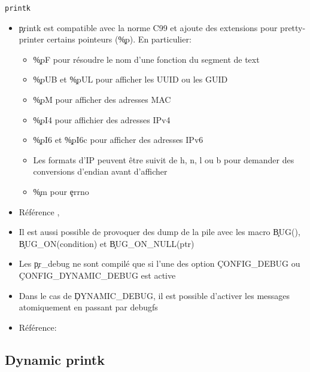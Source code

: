 \begin{frame}[fragile=singleslide]{\texttt{printk}}
  \begin{itemize} 
  \item  \c{printk} est  compatible avec  la norme  C99 et  ajoute des
   extensions  pour  pretty-printer  certains pointeurs  (\c{\%p}).  En
   particulier:
     \begin{itemize}
    \item \c{\%pF}  pour résoudre le  nom d'une fonction du  segment de
      text
    \item \c{\%pUB} et \c{\%pUL} pour afficher les UUID ou les GUID
    \item \c{\%pM} pour afficher des adresses MAC
    \item \c{\%pI4} pour affichier des adresses IPv4
    \item \c{\%pI6} et \c{\%pI6c} pour afficher des adresses IPv6
    \item Les  formats d'IP peuvent être suivit  de h, n, l  ou b pour
      demander des conversions d'endian avant d'afficher
    \item \c{\%m} pour \c{errno}
    \end{itemize} 
  \item                Référence                ,
  \item Il  est aussi possible de  provoquer des dump de  la pile avec
    les macro \c{BUG()}, \c{BUG_ON(condition)} et \c{BUG_ON_NULL(ptr)}
  \item  Les \c{pr_debug}  ne sont  compilé  que si  l'une des  option
    \c{CONFIG_DEBUG} ou \c{CONFIG_DYNAMIC_DEBUG} est active
  \item Dans  le cas de  \c{DYNAMIC_DEBUG}, il est  possible d'activer
    les messages atomiquement en passant par debugfs
  \item Référence: 
  \end{itemize} 
\end{frame} 

\subsection{Dynamic printk}

